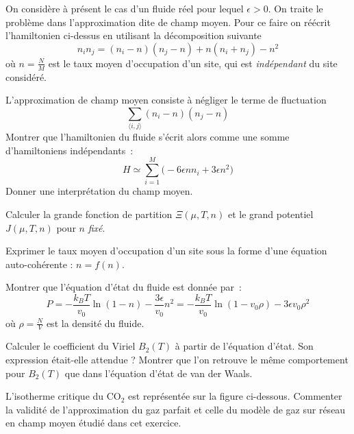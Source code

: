 On considère à présent le cas d'un fluide réel pour lequel $\epsilon>0$. On traite le problème dans l'approximation dite de champ moyen. Pour ce faire on réécrit l'hamiltonien ci-dessus en utilisant la décomposition suivante
$$
n_i n_j = (n_i -n)(n_j -n)+ n(n_i+n_j)-n^2
$$
où $n=\frac{N}{M}$ est le taux moyen d'occupation d'un site, qui est {\it indépendant} du site considéré.

\question
L'approximation de champ moyen consiste à négliger le terme de fluctuation
$$
\sum_{\langle i,j\rangle} (n_i -n)(n_j -n)
$$
Montrer que l'hamiltonien du fluide s'écrit alors comme une somme d'hamiltoniens indépendants~:
$$
H \simeq \sum_{i=1}^{M}\bigg(-6\epsilon n n_i+ 3\epsilon n^2 \bigg)
$$
Donner une interprétation du \og champ moyen\fg.

\question
Calculer la grande fonction de partition $\Xi(\mu,T,n)$ et le grand potentiel $J(\mu,T,n)$ pour $n$ {\it fixé}.

\question
Exprimer le taux moyen d'occupation d'un site sous la forme d'une équation auto-cohérente : $n=f(n)$.

\question
Montrer que l'équation d'état du fluide est donnée par~:
$$
P=-\frac{k_BT}{v_0} \ln(1-n) -\frac{3\epsilon} {v_0}n^2 =-\frac{k_BT}{v_0} \ln(1-v_0\rho) -3\epsilon v_0 \rho^2
$$
où $\rho=\frac{N}{V}$ est la densité du fluide. 

\question
Calculer le coefficient du Viriel $B_2(T)$ à partir de l'équation d'état. Son expression était-elle attendue ? Montrer que l'on retrouve le même comportement pour $B_2(T)$ que dans l'équation d'état de van der Waals.

\question
L'isotherme critique du CO$_2$ est représentée sur la figure ci-dessous. Commenter la validité de l'approximation du gaz parfait et celle du modèle de gaz sur réseau en champ moyen étudié dans cet exercice.


